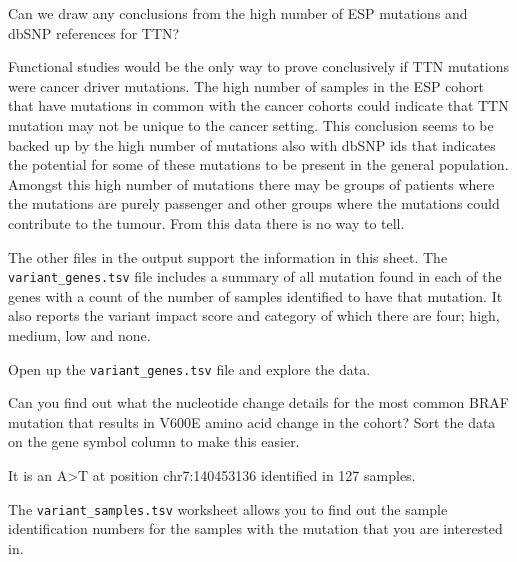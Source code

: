 \begin{questions}
Can we draw any conclusions from the high number of ESP mutations and dbSNP references for TTN?
\end{questions}

\begin{answer}
Functional studies would be the only way to prove conclusively if TTN mutations were cancer driver mutations.
The high number of samples in the ESP cohort that have mutations in common with the cancer cohorts
could indicate that TTN mutation may not be unique to the cancer setting. This conclusion seems to be
backed up by the high number of mutations also with dbSNP ids that indicates the potential for some of
these mutations to be present in the general population.
\vspace{4 mm}
Amongst this high number of mutations there may be groups of patients where the mutations are purely
passenger and other groups where the mutations could contribute to the tumour.
\vspace{4 mm}
From this data there is no way to tell.
\end{answer}

\begin{information}
The other files in the output support the information in this sheet.
\vspace{4 mm}
The \texttt{variant\_genes.tsv} file includes a summary of all mutation found in each of the genes with a count
of the number of samples identified to have that mutation. It also reports the variant impact score
and category of which there are four; high, medium, low and none.
\end{information}

\begin{steps}
Open up the \texttt{variant\_genes.tsv} file and explore the data. 
\end{steps}

\begin{questions} 
Can you find out what the nucleotide change details for the most common BRAF mutation that results
in V600E amino acid change in the cohort?
Sort the data on the gene symbol column to make this easier.
\end{questions}

\begin{answer}
It is an A>T at position chr7:140453136 identified in 127 samples.
\end{answer}

\begin{information}
The \texttt{variant\_samples.tsv} worksheet allows you to find out the sample identification numbers
for the samples with the mutation that you are interested in.
\end{information}

